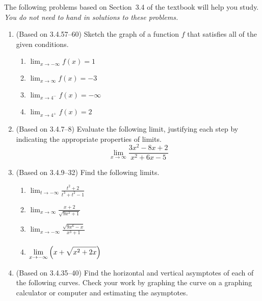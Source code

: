 \documentclass[11pt]{article}
\title{\commonPSTitleZeroThreeFour}
\author{\commonAuthor}
\date{\commonDateZeroThreeFour}
\newcommand{\ds}{\displaystyle}
\begin{document}
\maketitle
\thispagestyle{empty}

\noindent
The following problems based on Section~3.4 of the textbook will help
you study.  \emph{You do not need to hand in solutions to these
  problems.}
\begin{enumerate}
\item (Based on 3.4.57--60) %
  Sketch the graph of a function $f$ that satisfies all of the given
  conditions.
  \begin{multicols}{4}
  \begin{enumerate}
  \item[] $\ds \lim_{x\to -\infty} f(x)=1$
  \item[] $\ds \lim_{x\to \infty} f(x) = -3$
  \item[] $\ds \lim_{x\to 4^-} f(x) = -\infty$
  \item[] $\ds \lim_{x\to 4^+} f(x) = 2$
  \end{enumerate}
  \end{multicols}
\item (Based on 3.4.7--8) %
  Evaluate the following limit, justifying each step by indicating the
  appropriate properties of limits.
  \begin{equation*}
    \lim_{x\to\infty} \frac{3x^2-8x+2}{x^2+6x-5}
  \end{equation*}
\item (Based on 3.4.9--32) %
  Find the following limits.
  \begin{multicols}{2}
  \begin{enumerate}
  \item $\ds \lim_{t\to -\infty} \frac{t^2+2}{t^3+t^2-1}$
  \item $\ds \lim_{x\to\infty} \frac{x+2}{\sqrt{9x^2+1}}$
  \item $\ds \lim_{x\to -\infty} \frac{\sqrt{9x^6-x}}{x^3+1}$
  \item $\ds \lim_{x\to -\infty} \left(x+\sqrt{x^2+2x}\right)
    \vphantom{\frac{\sqrt{9x^6}}{x^3}}$
  \end{enumerate}
  \end{multicols}
\item (Based on 3.4.35--40) %
  Find the horizontal and vertical asymptotes of each of the following
  curves.  Check your work by graphing the curve on a graphing
  calculator or computer and estimating the asymptotes.
  \begin{multicols}{3}

\end{multicols}
\end{enumerate}
\end{document}
